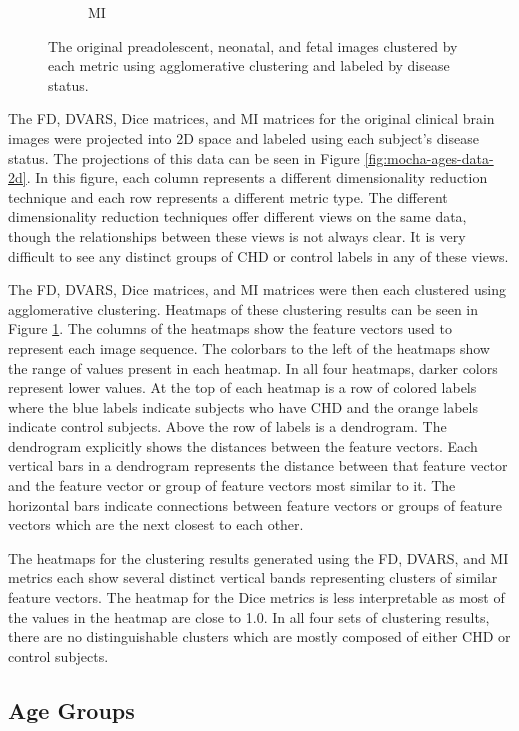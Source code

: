 \begin{figure}[]
\begin{subfigure}{0.49\textwidth}
		\caption{MI}
	\end{subfigure}
\vspace{-10mm}
\caption{The original preadolescent, neonatal, and fetal images clustered by each metric using agglomerative clustering and labeled by disease status.}
\label{fig:mocha-cohorts-sns-agg}
\end{figure}

The FD, DVARS, Dice matrices, and MI matrices for the original clinical brain images were projected into 2D space and labeled using each subject's disease status. The projections of this data can be seen in Figure \ref{fig:mocha-ages-data-2d}. In this figure, each column represents a different dimensionality reduction technique and each row represents a different metric type. The different dimensionality reduction techniques offer different views on the same data, though the relationships between these views is not always clear. It is very difficult to see any distinct groups of CHD or control labels in any of these views.

The FD, DVARS, Dice matrices, and MI matrices were then each clustered using agglomerative clustering. Heatmaps of these clustering results can be seen in Figure \ref{fig:mocha-cohorts-sns-agg}. The columns of the heatmaps show the feature vectors used to represent each image sequence. The colorbars to the left of the heatmaps show the range of values present in each heatmap. In all four heatmaps, darker colors represent lower values. At the top of each heatmap is a row of colored labels where the blue labels indicate subjects who have CHD and the orange labels indicate control subjects. Above the row of labels is a dendrogram. The dendrogram explicitly shows the distances between the feature vectors. Each vertical bars in a dendrogram represents the distance between that feature vector and the feature vector or group of feature vectors most similar to it. The horizontal bars indicate connections between feature vectors or groups of feature vectors which are the next closest to each other.

The heatmaps for the clustering results generated using the FD, DVARS, and MI metrics each show several distinct vertical bands representing clusters of similar feature vectors. The heatmap for the Dice metrics is less interpretable as most of the values in the heatmap are close to 1.0. In all four sets of clustering results, there are no distinguishable clusters which are mostly composed of either CHD or control subjects.

\subsection{Age Groups}

